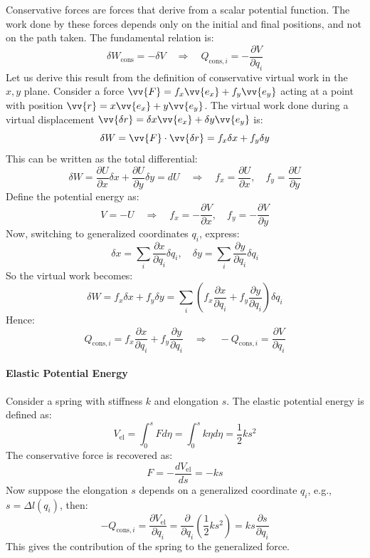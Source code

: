 Conservative forces are forces that derive from a scalar potential function. The work done by these forces depends only on the initial and final positions, and not on the path taken. The fundamental relation is:
\[
\delta W_{\text{cons}} = - \delta V \quad \Rightarrow \quad Q_{\text{cons},i} = - \frac{\partial V}{\partial q_i}
\]
Let us derive this result from the definition of conservative virtual work in the \( x,y \) plane. Consider a force \( \vv{F} = f_x \vv{e_x} + f_y \vv{e_y} \) acting at a point with position \( \vv{r} = x \vv{e_x} + y \vv{e_y} \). The virtual work done during a virtual displacement \( \vv{\delta r} = \delta x \vv{e_x} + \delta y \vv{e_y} \) is:
\[
\delta W = \vv{F} \cdot \vv{\delta r} = f_x \delta x + f_y \delta y
\]
This can be written as the total differential:
\[
\delta W = \frac{\partial U}{\partial x} \delta x + \frac{\partial U}{\partial y} \delta y = dU
\quad \Rightarrow \quad f_x = \frac{\partial U}{\partial x}, \quad f_y = \frac{\partial U}{\partial y}
\]
Define the potential energy as:
\[
V = -U
\quad \Rightarrow \quad f_x = -\frac{\partial V}{\partial x}, \quad f_y = -\frac{\partial V}{\partial y}
\]
Now, switching to generalized coordinates \( q_i \), express:
\[
\delta x = \sum_i \frac{\partial x}{\partial q_i} \delta q_i, \quad
\delta y = \sum_i \frac{\partial y}{\partial q_i} \delta q_i
\]
So the virtual work becomes:
\[
\delta W = f_x \delta x + f_y \delta y
= \sum_i \left( f_x \frac{\partial x}{\partial q_i} + f_y \frac{\partial y}{\partial q_i} \right) \delta q_i
\]
Hence:
\[
Q_{\text{cons},i} = f_x \frac{\partial x}{\partial q_i} + f_y \frac{\partial y}{\partial q_i}
\quad \Rightarrow \quad
- Q_{\text{cons},i} = \frac{\partial V}{\partial q_i}
\]

\paragraph{Elastic Potential Energy}

Consider a spring with stiffness \( k \) and elongation \( s \). The elastic potential energy is defined as:
\[
V_{\text{el}} = \int_0^s F  d\eta = \int_0^s k\eta  d\eta = \frac{1}{2} k s^2
\]
The conservative force is recovered as:
\[
F = -\frac{dV_{\text{el}}}{ds} = -ks
\]
Now suppose the elongation \( s \) depends on a generalized coordinate \( q_i \), e.g., \( s = \Delta l(q_i) \), then:
\[
- Q_{\text{cons},i} = \frac{\partial V_{\text{el}}}{\partial q_i} = \frac{\partial}{\partial q_i} \left( \frac{1}{2} k s^2 \right)
= k s \frac{\partial s}{\partial q_i}
\]
This gives the contribution of the spring to the generalized force.

